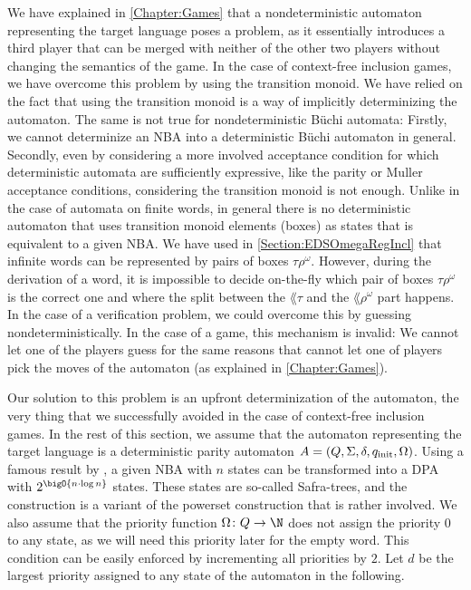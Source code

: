 \documentclass[../../diss.tex]{subfiles}
\begin{document}
We have explained in \cref{Chapter:Games} that a nondeterministic automaton representing the target language poses a problem, as it essentially introduces a third player that can be merged with neither of the other two players without changing the semantics of the game.
In the case of context-free inclusion games, we have overcome this problem by using the transition monoid.
We have relied on the fact that using the transition monoid is a way of implicitly determinizing the automaton.
The same is not true for nondeterministic Büchi automata:
Firstly, we cannot determinize an NBA into a deterministic Büchi automaton in general.
Secondly, even by considering a more involved acceptance condition for which deterministic automata are sufficiently expressive, like the parity or Muller acceptance conditions, considering the transition monoid is not enough.
Unlike in the case of automata on finite words, in general there is no deterministic automaton that uses transition monoid elements (boxes) as states that is equivalent to a given NBA.\@
We have used in \cref{Section:EDSOmegaRegIncl} that infinite words can be represented by pairs of boxes $\tau\rho^\omega$.
However, during the derivation of a word, it is impossible to decide on-the-fly which pair of boxes $\tau\rho^\omega$ is the correct one and where the split between the $\lang{\tau}$ and the $\lang{\rho}^\omega$ part happens.
In the case of a verification problem, we could overcome this by guessing nondeterministically.
In the case of a game, this mechanism is invalid:
We cannot let one of the players guess for the same reasons that cannot let one of players pick the moves of the automaton (as explained in \cref{Chapter:Games}).

Our solution to this problem is an upfront determinization of the automaton, the very thing that we successfully avoided in the case of context-free inclusion games.
In the rest of this section, we assume that the automaton representing the target language is a deterministic parity automaton $A = (Q, \Sigma, \delta, q_{\text{init}}, \Omega)$.
Using a famous result by , a given NBA with $n$ states can be transformed into a DPA with $2^{\bigO{n \cdot \log n}}$ states.
These states are so-called Safra-trees, and the construction is a variant of the powerset construction that is rather involved.
We also assume that the priority function $\Omega \colon Q \to \N$ does not assign the priority $0$ to any state, as we will need this priority later for the empty word.
This condition can be easily enforced by incrementing all priorities by $2$.
Let $d$ be the largest priority assigned to any state of the automaton in the following.
\end{document}
